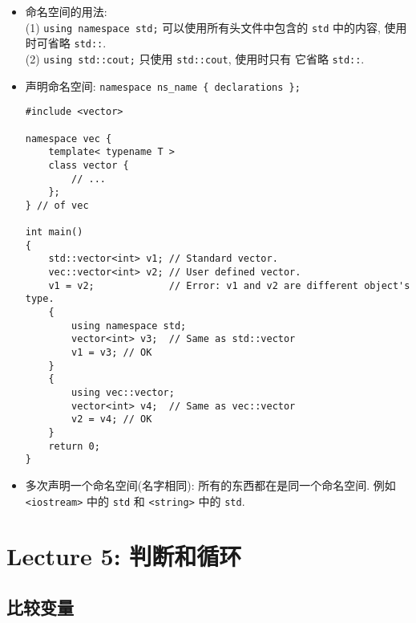 \documentclass[a4paper,UTF8]{ctexart}
\begin{document}
\begin{itemize}[leftmargin=0pt, rightmargin=0cm, labelwidth=0.8cm, labelsep=0.2cm]
\item 命名空间的用法:\\
(1) \lstinline{using namespace std;} \quad 可以使用所有头文件中包含的
\lstinline{std} 中的内容, 使用时可省略 \lstinline{std::}. \\
(2) \lstinline{using std::cout;} \quad 只使用 \lstinline{std::cout}, 使用时只有
它省略 \lstinline{std::}.
\item 声明命名空间: \lstinline$namespace ns_name { declarations };$
\begin{lstlisting}
#include <vector>
 
namespace vec {
    template< typename T >
    class vector {
        // ...
    };
} // of vec
 
int main()
{
    std::vector<int> v1; // Standard vector.
    vec::vector<int> v2; // User defined vector.
    v1 = v2;             // Error: v1 and v2 are different object's type.
    {
        using namespace std;
        vector<int> v3;  // Same as std::vector
        v1 = v3; // OK
    }
    {
        using vec::vector;
        vector<int> v4;  // Same as vec::vector
        v2 = v4; // OK
    }
    return 0;
}
\end{lstlisting}
\item 多次声明一个命名空间(名字相同): 所有的东西都在是同一个命名空间. 例如
  \lstinline{<iostream>} 中的 \lstinline{std} 和 \lstinline{<string>} 中的 \lstinline{std}.
\end{itemize}

\section{Lecture 5: 判断和循环}

\subsection*{比较变量}
\end{document}
